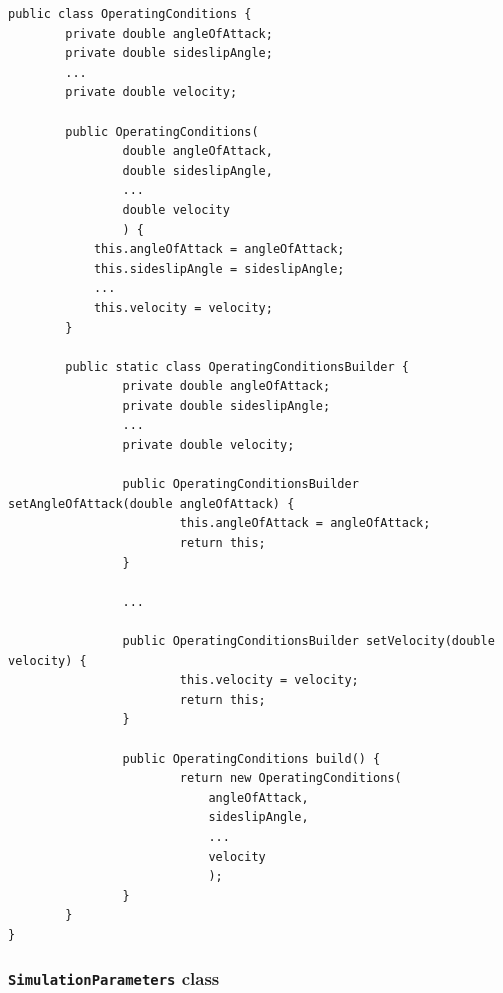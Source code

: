 %
\bigskip
\begin{lstlisting}[caption={\lstinline!OperatingConditions! class overview}, captionpos=b, tabsize=2, label={lst:OperatingConditions}]	
public class OperatingConditions {
		private double angleOfAttack;
		private double sideslipAngle;
		...
		private double velocity;
	
		public OperatingConditions(
				double angleOfAttack,
				double sideslipAngle,
				...
				double velocity
				) {
			this.angleOfAttack = angleOfAttack;
			this.sideslipAngle = sideslipAngle;
			...
			this.velocity = velocity;		
		}

		public static class OperatingConditionsBuilder {
				private double angleOfAttack;
				private double sideslipAngle;
				...
				private double velocity;
		
				public OperatingConditionsBuilder setAngleOfAttack(double angleOfAttack) {
						this.angleOfAttack = angleOfAttack;
						return this;
				}
		
				...
		
				public OperatingConditionsBuilder setVelocity(double velocity) {
						this.velocity = velocity;
						return this;
				}
		
				public OperatingConditions build() {
						return new OperatingConditions(
							angleOfAttack,
							sideslipAngle,
							...
							velocity				
							);
				}
		}
}
\end{lstlisting}
%

\subsubsection{\texttt{SimulationParameters} class}

